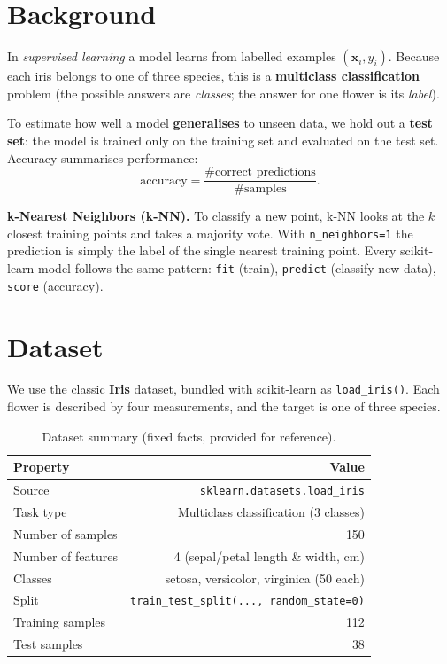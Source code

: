 \documentclass[11pt,a4paper]{article}
\begin{document}
\section{Background}
In \emph{supervised learning} a model learns from labelled examples
$(\mathbf{x}_i, y_i)$. Because each iris belongs to one of three species, this
is a \textbf{multiclass classification} problem (the possible answers are
\emph{classes}; the answer for one flower is its \emph{label}).

To estimate how well a model \textbf{generalises} to unseen data, we hold out a
\textbf{test set}: the model is trained only on the training set and evaluated on
the test set. Accuracy summarises performance:
\[
  \text{accuracy} = \frac{\text{\# correct predictions}}{\text{\# samples}}.
\]

\noindent\textbf{k-Nearest Neighbors (k-NN).} To classify a new point, k-NN looks
at the $k$ closest training points and takes a majority vote. With
\lstinline|n_neighbors=1| the prediction is simply the label of the single
nearest training point. Every scikit-learn model follows the same pattern:
\lstinline|fit| (train), \lstinline|predict| (classify new data),
\lstinline|score| (accuracy).

\section{Dataset}
We use the classic \textbf{Iris} dataset, bundled with scikit-learn as
\lstinline|load_iris()|. Each flower is described by four measurements, and the
target is one of three species.

\begin{table}[H]
\centering
\caption{Dataset summary (fixed facts, provided for reference).}
\label{tab:dataset}
\begin{tabular}{@{}lr@{}}
\toprule
\textbf{Property} & \textbf{Value} \\
\midrule
Source              & \lstinline|sklearn.datasets.load_iris| \\
Task type           & Multiclass classification (3 classes) \\
Number of samples   & 150 \\
Number of features  & 4 (sepal/petal length \& width, cm) \\
Classes             & setosa, versicolor, virginica (50 each) \\
Split               & \lstinline|train_test_split(..., random_state=0)| \\
Training samples    & 112 \\
Test samples        & 38 \\
\bottomrule
\end{tabular}
\end{table}
\end{document}
